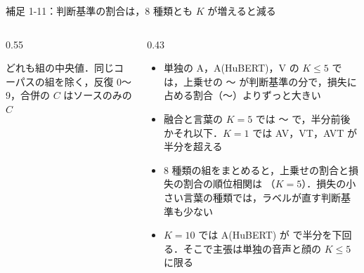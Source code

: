 \begin{frame}{補足 1-11：判断基準の割合は，8 種類とも $K$ が増えると減る}
\begin{columns}[T,onlytextwidth]
\begin{column}{0.55\textwidth}
      {\raggedright\tiny どれも組の中央値．同じコーパスの組を除く，反復 0〜9，合併の $C$ はソースのみの $C$\par}
    \end{column}
    \begin{column}{0.43\textwidth}
      \begin{itemize}\scriptsize\setlength{\itemsep}{4pt}
        \item 単独の A，A(HuBERT)，V の $K \le 5$ では，上乗せの 〜 が判断基準の分で，損失に占める割合（〜）よりずっと大きい
        \item 融合と言葉の $K=5$ では 〜 で，半分前後かそれ以下．$K=1$ では AV，VT，AVT が半分を超える
        \item 8 種類の組をまとめると，上乗せの割合と損失の割合の順位相関は （$K=5$）．損失の小さい言葉の種類では，ラベルが直す判断基準も少ない
        \item $K=10$ では A(HuBERT) が  で半分を下回る．そこで主張は単独の音声と顔の $K \le 5$ に限る
      \end{itemize}
    \end{column}
  \end{columns}
\end{frame}

